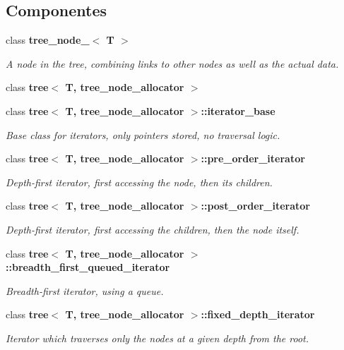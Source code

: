 \subsection*{Componentes}
\begin{DoxyCompactItemize}
\item 
class {\bf tree\+\_\+node\+\_\+$<$ T $>$}
\begin{DoxyCompactList}\small\item\em A node in the tree, combining links to other nodes as well as the actual data. \end{DoxyCompactList}\item 
class {\bf tree$<$ T, tree\+\_\+node\+\_\+allocator $>$}
\item 
class {\bf tree$<$ T, tree\+\_\+node\+\_\+allocator $>$\+::iterator\+\_\+base}
\begin{DoxyCompactList}\small\item\em Base class for iterators, only pointers stored, no traversal logic. \end{DoxyCompactList}\item 
class {\bf tree$<$ T, tree\+\_\+node\+\_\+allocator $>$\+::pre\+\_\+order\+\_\+iterator}
\begin{DoxyCompactList}\small\item\em Depth-\/first iterator, first accessing the node, then its children. \end{DoxyCompactList}\item 
class {\bf tree$<$ T, tree\+\_\+node\+\_\+allocator $>$\+::post\+\_\+order\+\_\+iterator}
\begin{DoxyCompactList}\small\item\em Depth-\/first iterator, first accessing the children, then the node itself. \end{DoxyCompactList}\item 
class {\bf tree$<$ T, tree\+\_\+node\+\_\+allocator $>$\+::breadth\+\_\+first\+\_\+queued\+\_\+iterator}
\begin{DoxyCompactList}\small\item\em Breadth-\/first iterator, using a queue. \end{DoxyCompactList}\item 
class {\bf tree$<$ T, tree\+\_\+node\+\_\+allocator $>$\+::fixed\+\_\+depth\+\_\+iterator}
\begin{DoxyCompactList}\small\item\em Iterator which traverses only the nodes at a given depth from the root. \end{DoxyCompactList}\item 

\end{DoxyCompactItemize}
